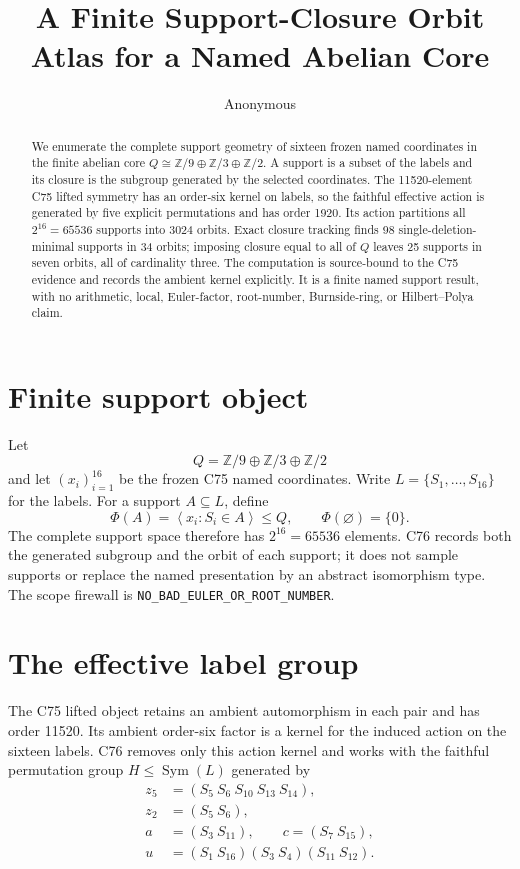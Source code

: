 \documentclass[10pt]{article}
\title{A Finite Support-Closure Orbit Atlas for a Named Abelian Core}
\author{Anonymous}
\date{}
\newcommand{\Z}{\mathbb Z}
\newcommand{\Sym}{\operatorname{Sym}}
\begin{document}
\maketitle

\begin{abstract}
We enumerate the complete support geometry of sixteen frozen named
coordinates in the finite abelian core
$Q\cong\Z/9\oplus\Z/3\oplus\Z/2$.  A support is a subset of the labels and
its closure is the subgroup generated by the selected coordinates.  The
11520-element C75 lifted symmetry has an order-six kernel on labels, so the
faithful effective action is generated by five explicit permutations and has
order 1920.  Its action partitions all $2^{16}=65536$ supports into 3024
orbits.  Exact closure tracking finds 98 single-deletion-minimal supports in
34 orbits; imposing closure equal to all of $Q$ leaves 25 supports in seven
orbits, all of cardinality three.  The computation is source-bound to the C75
evidence and records the ambient kernel explicitly.  It is a finite named
support result, with no arithmetic, local, Euler-factor, root-number,
Burnside-ring, or Hilbert--Polya claim.
\end{abstract}

\section{Finite support object}
Let
\[
Q=\Z/9\oplus\Z/3\oplus\Z/2
\]
and let $(x_i)_{i=1}^{16}$ be the frozen C75 named coordinates.  Write
$L=\{S_1,\ldots,S_{16}\}$ for the labels.  For a support $A\subseteq L$,
define
\[
\Phi(A)=\left\langle x_i:S_i\in A\right\rangle\leq Q,
\qquad \Phi(\varnothing)=\{0\}.
\]
The complete support space therefore has $2^{16}=65536$ elements.  C76
records both the generated subgroup and the orbit of each support; it does
not sample supports or replace the named presentation by an abstract
isomorphism type.  The scope firewall is
\texttt{NO\_BAD\_EULER\_OR\_ROOT\_NUMBER}.

\section{The effective label group}
The C75 lifted object retains an ambient automorphism in each pair and has
order 11520.  Its ambient order-six factor is a kernel for the induced action
on the sixteen labels.  C76 removes only this action kernel and works with
the faithful permutation group $H\leq\Sym(L)$ generated by
\[
\begin{split}
z_5&=(S_5\ S_6\ S_{10}\ S_{13}\ S_{14}),\\
z_2&=(S_5\ S_6),\\
a&=(S_3\ S_{11}),\qquad c=(S_7\ S_{15}),\\
u&=(S_1\ S_{16})(S_3\ S_4)(S_{11}\ S_{12}).
\end{split}
\]
\end{document}
